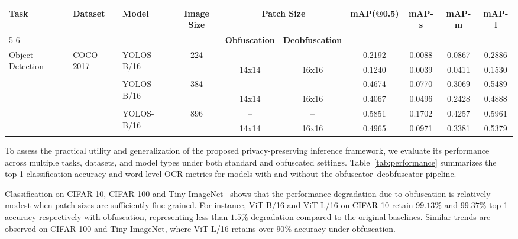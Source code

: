 \documentclass{ieeeaccess}
\begin{document}
\begin{table}[t]
\begin{tabular}{lllc|cc|c|ccc}
\multirow{3}{*}{\textbf{Task}} & \multirow{3}{*}{\textbf{Dataset}} & \multirow{3}{*}{\textbf{Model}} & \multirow{3}{*}{\textbf{Image Size}} 
& \multicolumn{2}{c|}{\textbf{Patch Size}} 
& \multirow{3}{*}{\textbf{mAP(@0.5)}} 
& \multirow{3}{*}{\textbf{mAP-s}} 
&\multirow{3}{*}{\textbf{mAP-m}} 
&\multirow{3}{*}{\textbf{mAP-l}}  \\

\cmidrule{5-6} 
& & & 
& \textbf{Obfuscation} & \textbf{Deobfuscation} 
&  &  &  &  \\

\midrule

\multirow{6}{*}{Object Detection} 
& \multirow{6}{*}{COCO 2017} 
& \multirow{2}{*}{YOLOS-B/16} & \multirow{2}{*}{224} 
& --     & --     & 0.2192 & 0.0088      & 0.0867     & 0.2886     \\
&       &        &        & 14x14 & 16x16 & 0.1240 & 0.0039  & 0.0411  & 0.1530  \\
& \multirow{2}{*}{} & \multirow{2}{*}{YOLOS-B/16} & \multirow{2}{*}{384} 
& --     & --     & 0.4674 &  0.0770  &   0.3069   &   0.5489   \\
&       &        &        & 14x14 & 16x16 & 0.4067 & 0.0496 & 0.2428 & 0.4888  \\
& \multirow{2}{*}{} & \multirow{2}{*}{YOLOS-B/16} & \multirow{2}{*}{896} 
& --     & --     & 0.5851 &  0.1702  &   0.4257   &   0.5961   \\
&       &        &        & 14x14 & 16x16 & 0.4965 & 0.0971 & 0.3381 & 0.5379  \\
\bottomrule
\end{tabular}
\end{table}


To assess the practical utility and generalization of the proposed privacy-preserving inference framework, we evaluate its performance across multiple tasks, datasets, and model types under both standard and obfuscated settings. Table~\ref{tab:performance} summarizes the top-1 classification accuracy and word-level OCR metrics for models with and without the obfuscator–deobfuscator pipeline.

Classification on CIFAR-10, CIFAR-100 and {Tiny-ImageNet~}\cite{Le2015TinyIV} shows that the performance degradation due to obfuscation is relatively modest when patch sizes are sufficiently fine-grained. For instance, ViT-B/16 and ViT-L/16 on CIFAR-10 retain $99.13\%$ and $99.37\%$ top-1 accuracy respectively with obfuscation, representing less than $1.5\%$ degradation compared to the original baselines. Similar trends are observed on CIFAR-100 and {Tiny-ImageNet}, where ViT-L/16 retains over $90\%$ accuracy under obfuscation.
\end{document}
